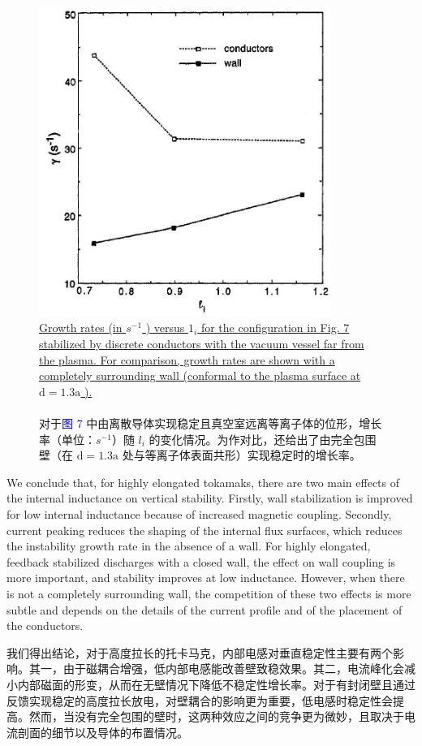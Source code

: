 \documentclass[utf8]{ctexart}
\newcommand\enzhbox[2]{
  	\quad\par \begin{paracol}{2} \colseprulecolor{black} 
  		\begin{spacing}{1.0}
  			\footnotesize  #1
  		\end{spacing}
  		\switchcolumn[1] 
  		#2
  	\end{paracol} \quad\par
  }
\begin{document}
\begin{sloppypar}
   \begin{figure}[H]
  	\centering
  	\includegraphics[max width=0.85\textwidth,max height=0.3\textheight]{2025_01_10_a0135324997886412d98g-8}
 \caption{\uline{Growth rates (in $s^{-1}$ ) versus $1_{i}$ for the configuration in Fig. 7 stabilized by discrete conductors with the vacuum vessel far from the plasma. For comparison, growth rates are shown with a completely surrounding wall (conformal to the plasma surface at $\mathrm{d}=1.3 \mathrm{a}$ ).\\}\\对于\textcolor{blue}{图 7} 中由离散导体实现稳定且真空室远离等离子体的位形，增长率（单位：$s^{-1}$）随 $l_{i}$ 的变化情况。为作对比，还给出了由完全包围壁（在 $\mathrm{d}=1.3 \mathrm{a}$ 处与等离子体表面共形）实现稳定时的增长率。 }
  	\label{fig8.}
  \end{figure}
  
 
  
 
\enzhbox{  We conclude that, for highly elongated tokamaks, there are two main effects of the internal inductance on vertical stability. Firstly, wall stabilization is improved for low internal inductance because of increased magnetic coupling. Secondly, current peaking reduces the shaping of the internal flux surfaces, which reduces the instability growth rate in the absence of a wall. For highly elongated, feedback stabilized discharges with a closed wall, the effect on wall coupling is more important, and stability improves at low inductance. However, when there is not a completely surrounding wall, the competition of these two effects is more subtle and depends on the details of the current profile and of the placement of the conductors.}{
我们得出结论，对于高度拉长的托卡马克，内部电感对垂直稳定性主要有两个影响。其一，由于磁耦合增强，低内部电感能改善壁致稳效果。其二，电流峰化会减小内部磁面的形变，从而在无壁情况下降低不稳定性增长率。对于有封闭壁且通过反馈实现稳定的高度拉长放电，对壁耦合的影响更为重要，低电感时稳定性会提高。然而，当没有完全包围的壁时，这两种效应之间的竞争更为微妙，且取决于电流剖面的细节以及导体的布置情况。 }
  

\end{sloppypar}
\end{document}
